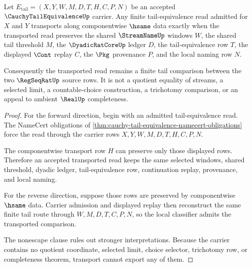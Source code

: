 \begin{theorem}
\label{thm:cauchy-tail-equivalence-tail-transport}
Let $E_{\mathrm{tail}}=(X,Y,W,M,D,T,H,C,P,N)$ be an accepted $\CauchyTailEquivalenceUp$ carrier. Any finite tail-equivalence read admitted for $X$ and $Y$ transports along componentwise $\hsame$ data exactly when the transported read preserves the shared $\StreamNameUp$ windows $W$, the shared tail threshold $M$, the $\DyadicRatCoreUp$ ledger $D$, the tail-equivalence row $T$, the displayed $\Cont$ replay $C$, the $\Pkg$ provenance $P$, and the local naming row $N$.

Consequently the transported read remains a finite tail comparison between the two $\RegSeqRatUp$ source rows. It is not a quotient equality of streams, a selected limit, a countable-choice construction, a trichotomy comparison, or an appeal to ambient $\RealUp$ completeness.
\end{theorem}
\begin{proof}
For the forward direction, begin with an admitted tail-equivalence read. The NameCert obligations of \autoref{thm:cauchy-tail-equivalence-namecert-obligations} force the read through the carrier rows $X,Y,W,M,D,T,H,C,P,N$.

The componentwise transport row $H$ can preserve only those displayed rows. Therefore an accepted transported read keeps the same selected windows, shared threshold, dyadic ledger, tail-equivalence row, continuation replay, provenance, and local naming.

For the reverse direction, suppose those rows are preserved by componentwise $\hsame$ data. Carrier admission and displayed replay then reconstruct the same finite tail route through $W,M,D,T,C,P,N$, so the local classifier admits the transported comparison.

The nonescape clause rules out stronger interpretations. Because the carrier contains no quotient coordinate, selected limit, choice selector, trichotomy row, or completeness theorem, transport cannot export any of them.
\end{proof}


